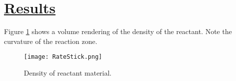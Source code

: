 \section*{\underline{Results}}
Figure \ref{fig:RateStick} shows a volume rendering of the density of the
reactant.  Note the curvature of the reaction zone.
\begin{figure}
 \texttt{[image: RateStick.png]}
\caption{Density of reactant material.}
\label{fig:RateStick}
\end{figure}

\newpage


%
%
